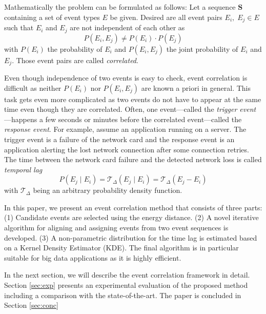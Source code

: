 \documentclass[conference]{IEEEtran}
\theoremstyle{examplestyle}
\begin{document}
Mathematically the problem can be formulated as follows: Let a sequence \(\pmb{S}\) containing a set of event types \(E\) be given. Desired are all event pairs \(E_i, \; E_j \in E\) such that \(E_i\) and \(E_j\) are not independent of each other as
\begin{equation}
	P(E_i, E_j) \neq P(E_i) \cdot P(E_j)
\end{equation}
with \(P(E_i)\) the probability of \(E_i\) and \(P(E_i, E_j)\) the joint probability of \(E_i\) and \(E_j\). Those event pairs are called \textit{correlated}.

Even though independence of two events is easy to check, event correlation is difficult as neither \(P(E_i)\) nor \(P(E_i, E_j)\) are known a priori in general. This task gets even more complicated as two events do not have to appear at the same time even though they are correlated. Often, one event---called the \textit{trigger event}---happens a few seconds or minutes before the correlated event---called the \textit{response event}. For example, assume an application running on a server. The trigger event is a failure of the network card and the response event is an application alerting the lost network connection after some connection retries. The time between the network card failure and the detected network loss is called \textit{temporal lag}
\begin{equation}
	P(E_j \; | \; E_i) = \mathcal{T}_\Delta (E_j \; | \; E_i) = \mathcal{T}_\Delta (E_j - E_i)
\end{equation}
with \(\mathcal{T}_\Delta\) being an arbitrary probability density function.

In this paper, we present an event correlation method that consists of three parts:
(1) Candidate  events are selected using the energy distance. (2) A novel iterative algorithm for aligning and assigning events from two event sequences is developed. (3) A
non-parametric distribution for the time lag is estimated based on a Kernel Density Estimator (KDE).
The final algorithm is in particular suitable for big data applications as it is highly efficient. 

In the next section, we will describe the event correlation framework in detail.
Section \ref{sec:exp} presents an experimental evaluation of the proposed method including a comparison with the state-of-the-art.
The paper is concluded in Section \ref{sec:conc}
\end{document}
